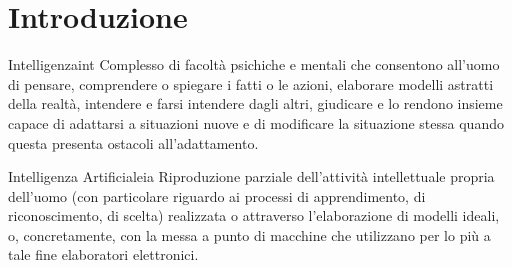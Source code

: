 \chapter{Introduzione}\label{chap:introduzione} %
\begin{definition}{Intelligenza}{int}
    Complesso di facoltà psichiche e mentali che consentono all'uomo di pensare, comprendere o spiegare i fatti o le azioni, elaborare modelli astratti della realtà, intendere e farsi intendere dagli altri, giudicare e lo rendono insieme capace di adattarsi a situazioni nuove e di modificare la situazione stessa quando questa presenta ostacoli all'adattamento.
\end{definition}
\begin{definition}{Intelligenza Artificiale}{ia}
    Riproduzione parziale dell'attività intellettuale propria dell'uomo (con particolare riguardo ai processi di apprendimento, di riconoscimento, di scelta) realizzata o attraverso l'elaborazione di modelli ideali, o, concretamente, con la messa a punto di macchine che utilizzano per lo più a tale fine elaboratori elettronici.
\end{definition}
%

